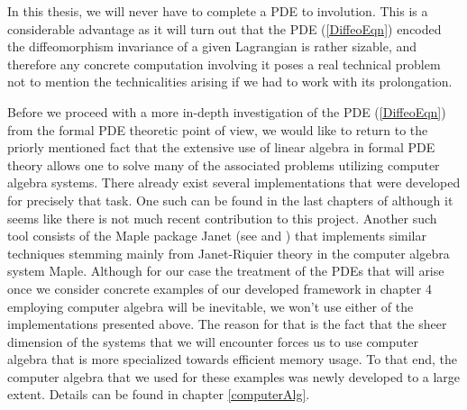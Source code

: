 In this thesis, we will never have to complete a PDE to involution. This is a considerable advantage as it will turn out that the PDE (\ref{DiffeoEqn}) encoded the diffeomorphism invariance of a given Lagrangian is rather sizable, and therefore any concrete computation involving it poses a real technical problem not to mention the technicalities arising if we had to work with its prolongation. 

Before we proceed with a more in-depth investigation of the PDE (\ref{DiffeoEqn}) from the formal PDE theoretic point of view, we would like to return to the priorly mentioned fact that the extensive use of linear algebra in formal PDE theory allows one to solve many of the associated problems utilizing computer algebra systems. There already exist several implementations that were developed for precisely that task. One such can be found in the last chapters of \cite{seiler1994analysis} although it seems like there is not much recent contribution to this project. Another such tool consists of the Maple package Janet (see \cite{Janet2} and \cite{Janet}) that implements similar techniques stemming mainly from Janet-Riquier theory in the computer algebra system Maple. 
Although for our case the treatment of the PDEs that will arise once we consider concrete examples of our developed framework in chapter 4 employing computer algebra will be inevitable, we won't use either of the implementations presented above. The reason for that is the fact that the sheer dimension of the systems that we will encounter forces us to use computer algebra that is more specialized towards efficient memory usage. To that end, the computer algebra that we used for these examples was newly developed to a large extent. Details can be found in chapter \ref{computerAlg}.    

